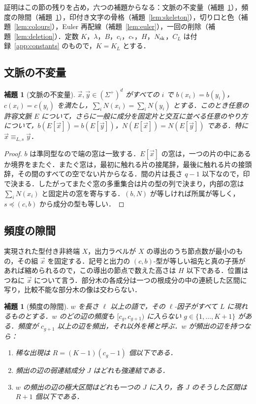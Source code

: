 \documentclass[11pt,a4paper]{ltjsarticle}
\numberwithin{equation}{section}
\theoremstyle{plain}
\newtheorem{lemma}[theorem]{補題}
\theoremstyle{definition}
\theoremstyle{remark}
\theoremstyle{plain}
\newcommand{\tuple}[1]{\vec{#1}}
\newcommand{\Kocc}{K_L}
\begin{document}
証明はこの節の残りを占め，六つの補題からなる：文脈の不変量（補題~\ref{lem:context}），頻度の隙間（補題~\ref{lem:gap}），印付き文字の骨格（補題~\ref{lem:skeleton}），切り口と色（補題~\ref{lem:colours}），Euler 再配線（補題~\ref{lem:euler}），一回の削除（補題~\ref{lem:deletion}）．定数 $K$，$\lambda$，$B$，$c_i$，$c_*$，$H$，$N_{\rm sk}$，$C_L$ は付録~\ref{app:constants} のもので，$K=\Kocc$ とする．

\subsection{文脈の不変量}

\begin{lemma}[文脈の不変量]
\label{lem:context}
$\tuple x,\tuple y\in(\Sigma^+)^d$ がすべての $i$ で $b(x_i)=b(y_i)$，$c(x_i)=c(y_i)$ を満たし，$\sum_iN(x_i)=\sum_iN(y_i)$ とする．このとき任意の許容文脈 $E$ について，さらに一般に成分を固定片と交互に並べる任意のやり方について，$b(E[\tuple x])=b(E[\tuple y])$，$N(E[\tuple x])=N(E[\tuple y])$ である．特に $\tuple x\equiv_{L,s}\tuple y$．
\end{lemma}

\begin{proof}
$b$ は準同型なので端の窓は一致する．$E[\tuple x]$ の窓は，一つの片の中にあるか境界をまたぐ．またぐ窓は，最初に触れる片の接尾辞，最後に触れる片の接頭辞，その間のすべての空でない片からなる．間の片は長さ $q-1$ 以下なので，印で決まる．したがってまたぐ窓の多重集合は片の型の列で決まり，内部の窓は $\sum_iN(x_i)$ と固定片の窓を寄与する．$(b,N)$ が等しければ所属が等しく，$s\preceq(c,b)$ から成分の型も等しい．
\end{proof}

\subsection{頻度の隙間}

実現された型付き非終端 $X$，出力ラベルが $X$ の導出のうち節点数が最小のもの，その組 $\tuple x$ を固定する．記号と出力の $(c,b)$-型が等しい祖先と真の子孫があれば縮められるので，この導出の節点で数えた高さは $H$ 以下である．位置はつねに $\tuple x$ について言う．部分木の各成分は一つの根成分の中の連続した区間に写り，比較不能な部分木の像は交わらない．

\begin{lemma}[頻度の隙間]
\label{lem:gap}
$w$ を長さ $\ell$ 以上の語で，その $\ell$-因子がすべて $L$ に現れるものとする．$w$ のどの辺の頻度も $[c_g,c_{g+1})$ に入らない $g\in\{1,\ldots,K+1\}$ がある．頻度が $c_{g+1}$ 以上の辺を\emph{頻出}，それ以外を\emph{稀}と呼ぶ．$w$ が頻出の辺を持つなら：
\begin{enumerate}[label=(\roman*),leftmargin=*]
\item 稀な出現は $R=(K-1)(c_g-1)$ 個以下である．
\item 頻出の辺の弱連結成分 $J$ はどれも強連結である．
\item $w$ の頻出の辺の極大区間はどれも一つの $J$ に入り，各 $J$ のそうした区間は $R+1$ 個以下である．
\end{enumerate}
\end{lemma}
\end{document}
